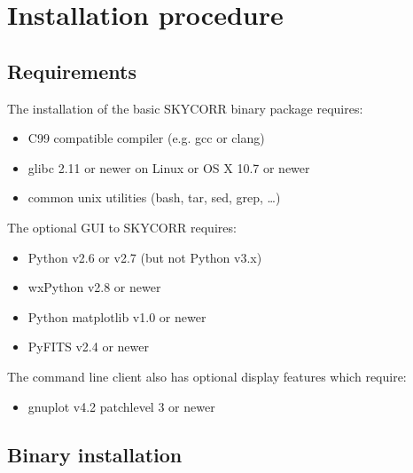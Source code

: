 \section{Installation procedure}\label{sec:installation}
\subsection{Requirements}\label{sec:requirements}
The installation of the basic SKYCORR binary package requires:
\begin{itemize}
  \item
    C99 compatible compiler (e.g. gcc or clang)
  \item
    glibc 2.11 or newer on Linux or OS X 10.7 or newer
  \item
    common unix utilities (bash, tar, sed, grep, \ldots{})
\end{itemize}

The optional \ac{GUI} to SKYCORR requires:

\begin{itemize}
  \item
    Python v2.6 or v2.7 (but not Python v3.x)
  \item
    wxPython v2.8 or newer
  \item
    Python matplotlib v1.0 or newer
  \item
    PyFITS v2.4 or newer
\end{itemize}

The command line client also has optional display features which
require:

\begin{itemize}
  \item gnuplot v4.2 patchlevel 3 or newer
\end{itemize}

\subsection{Binary installation}
\label{sec:installscript}

